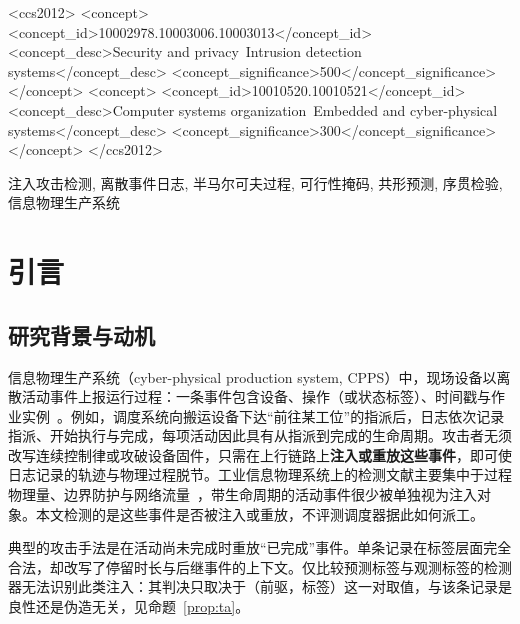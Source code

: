 \documentclass[manuscript,screen,review]{acmart}
\begin{document}
\begin{CCSXML}
<ccs2012>
   <concept>
       <concept_id>10002978.10003006.10003013</concept_id>
       <concept_desc>Security and privacy~Intrusion detection systems</concept_desc>
       <concept_significance>500</concept_significance>
       </concept>
   <concept>
       <concept_id>10010520.10010521</concept_id>
       <concept_desc>Computer systems organization~Embedded and cyber-physical systems</concept_desc>
       <concept_significance>300</concept_significance>
       </concept>
</ccs2012>
\end{CCSXML}


\begin{keywords}
注入攻击检测, 离散事件日志, 半马尔可夫过程, 可行性掩码,
共形预测, 序贯检验, 信息物理生产系统
\end{keywords}

\maketitle


\section{引言}
\label{sec:intro}

\subsection{研究背景与动机}
\label{sec:intro_bg}

信息物理生产系统（cyber-physical production system, CPPS）中，现场设备以离散活动事件上报运行过程：一条事件包含设备、操作（或状态标签）、时间戳与作业实例~\cite{monostori2016cpps,seiger2022factory}。例如，调度系统向搬运设备下达``前往某工位''的指派后，日志依次记录指派、开始执行与完成，每项活动因此具有从指派到完成的生命周期。攻击者无须改写连续控制律或攻破设备固件，只需在上行链路上\textbf{注入或重放这些事件}，即可使日志记录的轨迹与物理过程脱节。工业信息物理系统上的检测文献主要集中于过程物理量、边界防护与网络流量~\cite{kayan2022icps}，带生命周期的活动事件很少被单独视为注入对象。本文检测的是这些事件是否被注入或重放，不评测调度器据此如何派工。

典型的攻击手法是在活动尚未完成时重放``已完成''事件。单条记录在标签层面完全合法，却改写了停留时长与后继事件的上下文。仅比较预测标签与观测标签的检测器无法识别此类注入：其判决只取决于（前驱，标签）这一对取值，与该条记录是良性还是伪造无关，见命题~\ref{prop:ta}。
\end{document}
